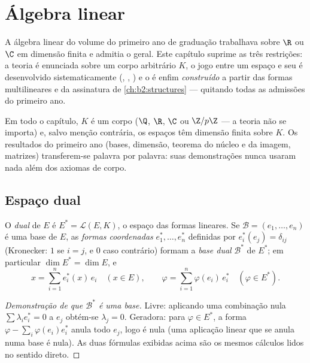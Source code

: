 \chapter{Álgebra linear}\label{ch:b2:linalg}

A álgebra linear do volume do primeiro ano de graduação trabalhava sobre $\R$ ou $\C$ em
dimensão finita e admitia o  geral. Este capítulo
suprime as três restrições: a teoria é enunciada sobre um
corpo arbitrário $K$, o jogo entre um espaço e seu
\emph{} é desenvolvido sistematicamente (, ,
) e o  é enfim \emph{construído} a partir das
formas multilineares  e da assinatura de
\cref{ch:b2:structures} --- quitando todas as admissões do primeiro ano.

Em todo o capítulo, $K$ é um corpo ($\Q$, $\R$, $\C$ ou $\Z/p\Z$ --- a
teoria não se importa) e, salvo menção contrária, os espaços têm
dimensão finita sobre $K$. Os resultados do primeiro ano (bases, dimensão,
teorema do núcleo e da imagem, matrizes) transferem-se palavra por palavra: suas demonstrações nunca usaram
nada além dos axiomas de corpo.

\section{Espaço dual}

\begin{definition}\label{def:b2:linalg:dual}
O \emph{dual} de $E$ é $E^* = \mathcal{L}(E,
K)$, o espaço das formas lineares. Se $\mathcal{B} = (e_1, \dots, e_n)$
é uma base de $E$, as \emph{formas coordenadas} $e_1^*, \dots, e_n^*$
definidas por $e_i^*(e_j) = \delta_{ij}$ (Kronecker: $1$ se $i = j$,
e $0$ caso contrário) formam a \emph{base dual}
$\mathcal{B}^*$ de $E^*$; em particular $\dim E^* = \dim E$, e
\[
x = \sum_{i=1}^{n} e_i^*(x)\, e_i \quad (x \in E),
\qquad
\varphi = \sum_{i=1}^{n} \varphi(e_i)\, e_i^* \quad (\varphi \in
E^*).
\]
\end{definition}

\begin{proof}[Demonstração de que $\mathcal{B}^*$ é uma base]
Livre: aplicando uma combinação nula $\sum \lambda_i e_i^* = 0$ a
$e_j$ obtém-se $\lambda_j = 0$. Geradora: para $\varphi \in E^*$, a
forma $\varphi - \sum_i \varphi(e_i) e_i^*$ anula todo $e_j$, logo
é nula (uma aplicação linear que se anula numa base é nula). As duas
fórmulas exibidas acima são os mesmos cálculos lidos no sentido direto.
\end{proof}

